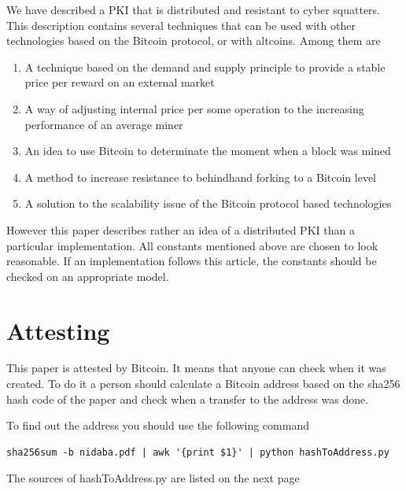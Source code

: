 \documentclass[12pt]{article}
\begin{document}
We have described a PKI that is distributed and resistant to cyber squatters. This description contains several techniques that can be used with other technologies based on the Bitcoin protocol, or with altcoins. Among them are
\begin{enumerate}
  \item A technique based on the demand and supply principle to provide a stable price per reward on an external market
  \item A way of adjusting internal price per some operation to the increasing performance of an average miner
  \item An idea to use Bitcoin to determinate the moment when a block was mined
  \item A method to increase resistance to behindhand forking to a Bitcoin level
  \item A solution to the scalability issue of the Bitcoin protocol based technologies
\end{enumerate}

However this paper describes rather an idea of a distributed PKI than a particular implementation. All constants mentioned above are chosen to look reasonable. If an implementation follows this article, the constants should be checked on an appropriate model.

\newpage

\section*{\hypertarget{attest}{Attesting}}

This paper is attested by Bitcoin. It means that anyone can check when it was created. To do it a person should calculate a Bitcoin address based on the sha256 hash code of the paper and check when a transfer to the address was done.

To find out the address you should use the following command

\lstset{
  language=bash,
  frame=tb,
  breaklines=true,
  columns=fullflexible,
  basicstyle = \ttfamily
}
\begin{lstlisting}
sha256sum -b nidaba.pdf | awk '{print $1}' | python hashToAddress.py
\end{lstlisting}
The sources of hashToAddress.py are listed on the next page

\newpage

\lstset{
  language=Python,
  frame=tb,
  breaklines=true,
  columns=fullflexible,
  basicstyle = \ttfamily
}

\end{document}
